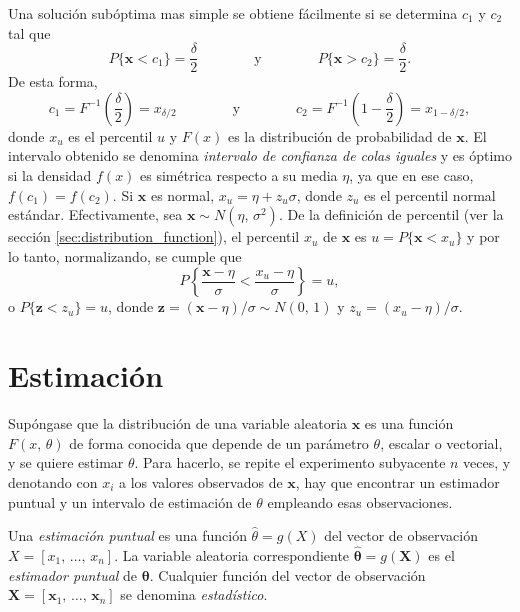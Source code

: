 \documentclass[a4paper]{report}
\newcommand{\X}{\mathbf{X}}
\newcommand{\x}{\mathbf{x}}
\newcommand{\z}{\mathbf{z}}
\newcommand{\thetabf}{\bm{\theta}}
\begin{document}
Una solución subóptima mas simple se obtiene fácilmente si se determina \(c_1\) y \(c_2\) tal que 
\[
 P\{\x<c_1\}=\frac{\delta}{2}
  \qquad\qquad\textrm{y}\qquad\qquad
 P\{\x>c_2\}=\frac{\delta}{2}.
\]
De esta forma,
\[
 c_1=F^{-1}\left(\frac{\delta}{2}\right)=x_{\delta/2}
 \qquad\qquad\textrm{y}\qquad\qquad
 c_2=F^{-1}\left(1-\frac{\delta}{2}\right)=x_{1-\delta/2},
\]
donde \(x_u\) es el percentil \(u\) y \(F(x)\) es la distribución de probabilidad de \(\x\). El intervalo obtenido se denomina \emph{intervalo de confianza de colas iguales} y es óptimo si la densidad \(f(x)\) es simétrica respecto a su media \(\eta\), ya que en ese caso, \(f(c_1)=f(c_2)\).
Si \(\x\) es normal, \(x_u=\eta+z_u\sigma\), donde \(z_u\) es el percentil normal estándar. Efectivamente, sea \(\x\sim N(\eta,\,\sigma^2)\). De la definición de percentil (ver la sección \ref{sec:distribution_function}),  el percentil \(x_u\) de \(\x\) es \(u=P\{\x<x_u\}\) y por lo tanto, normalizando, se cumple que
\[
 P\left\{\frac{\x-\eta}{\sigma}<\frac{x_u-\eta}{\sigma}\right\}=u,
\]
o \(P\{\z<z_u\}=u\), donde \(\z=(\x-\eta)/\sigma\sim N(0,\,1)\) y \(z_u=(x_u-\eta)/\sigma\).


\section{Estimación}

Supóngase que la distribución de una variable aleatoria \(\x\) es una función \(F(x,\,\theta)\) de forma conocida que depende de un parámetro \(\theta\), escalar o vectorial, y se quiere estimar \(\theta\). Para hacerlo, se repite el experimento subyacente \(n\) veces, y denotando con \(x_i\) a los valores observados de \(\x\), hay que encontrar un estimador puntual y un intervalo de estimación de \(\theta\) empleando esas observaciones.

Una \emph{estimación puntual} es una función \(\hat{\theta}=g(X)\) del vector de observación \(X=[x_1,\,\dots,\,x_n]\). La variable aleatoria correspondiente \(\hat{\thetabf}=g(\X)\) es el \emph{estimador puntual} de \(\thetabf\). Cualquier función del vector de observación \(\X=[\x_1,\,\dots,\,\x_n]\) se denomina \emph{estadístico}.
\end{document}
